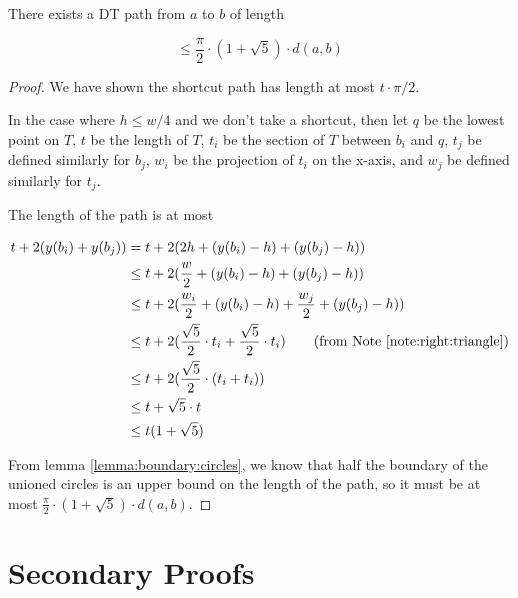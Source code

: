 \documentclass{tufte-handout}
\begin{document}
\begin{Theorem}

  There exists a DT path from $a$ to $b$ of length

  \begin{displaymath}
    \le \frac{\pi}{2} \cdot (1 + \sqrt{5}) \cdot d(a,b)
  \end{displaymath}

\end{Theorem}

\begin{proof}

  We have shown the shortcut path has length at most $t \cdot \pi /
  2$.

  In the case where $h \le w/4$ and we don't take a shortcut, then let
  $q$ be the lowest point on $T$, $t$ be the length of $T$, $t_i$ be
  the section of $T$ between $b_i$ and $q$, $t_j$ be defined similarly
  for $b_j$, $w_i$ be the projection of $t_i$ on the x-axis, and $w_j$
  be defined similarly for $t_j$.

  The length of the path is at most

  \begin{align*}
    t + 2(y(b_i) + y(b_j)) &= t + 2(2h + (y(b_i) - h) + (y(b_j) - h)) \\
    &\le t + 2(\frac{w}{2} + (y(b_i) - h) + (y(b_j) - h)) \\
    &\le t + 2(\frac{w_i}{2} + (y(b_i) - h) + \frac{w_j}{2} + (y(b_j) - h)) \\
    &\le t + 2(\frac{\sqrt{5}}{2} \cdot t_i + \frac{\sqrt{5}}{2} \cdot t_i)
    \tag{from Note \ref{note:right:triangle}} \\
    &\le t + 2(\frac{\sqrt{5}}{2} \cdot (t_i + t_i)) \\
    &\le t + \sqrt{5} \cdot t \\
    &\le t (1 + \sqrt{5})
  \end{align*}

  From lemma \ref{lemma:boundary:circles}, we know that half the
  boundary of the unioned circles is an upper bound on the length of
  the path, so it must be at most $\frac{\pi}{2} \cdot (1 + \sqrt{5})
  \cdot d(a,b)$.

\end{proof}

\newpage

\section{Secondary Proofs}
\end{document}
